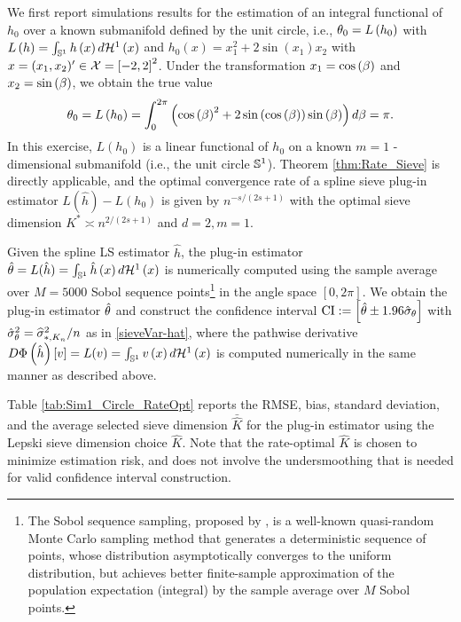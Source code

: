 \documentclass[12pt,american]{article}
\theoremstyle{definition}
\theoremstyle{plain}
\theoremstyle{definition}
\theoremstyle{plain}
\theoremstyle{plain}
\theoremstyle{plain}
\theoremstyle{plain}
\theoremstyle{plain}
\begin{document}
We first report simulations results for the estimation of an integral functional
of $h_0$ over a known submanifold defined by the unit
circle, i.e., $\t_{0}=L\left(h_{0}\right)$ with $L\left(h\right)=\int_{\S^{1}}h\left(x\right)d{\cal H}^{1}\left(x\right)$ and
$h_{0}\left(x\right)=x_{1}^{2}+2\sin\left(x_{1}\right)x_{2}$ with $x=(x_1,x_2)^{\prime} \in{\cal X}=\left[-2,2\right]^{2}$.
Under the transformation $x_{1}=\cos\left(\b\right)$ and
$x_{2}=\sin\left(\b\right)$, we obtain the true value
\[
  \t_{0}=L\left(h_{0}\right)=\int_{0}^{2\pi}\left(\text{cos}\left(\b\right)^{2}+2\sin\left(\cos\left(\b\right)\right)\sin\left(\b\right)\right)d\b=\pi.
\]
 In this exercise, $L(h_0)$ is a linear functional of $h_0$ on a known $m=1$ -dimensional submanifold (i.e., the unit circle $\S^{1}$). Theorem \ref{thm:Rate_Sieve} is directly applicable, and the optimal convergence rate of a spline sieve plug-in estimator $L(\hat{h}) - L(h_0)$ is given by $n^{-s/(2s+1)}$ with the optimal sieve dimension $K^* \asymp n^{2/(2s+1)}$ and $d=2,m=1$.


Given the spline LS estimator $\hat{h}$, the plug-in estimator $\hat{\t}=L(\hat{h})=\int_{\S^{1}} \hat{h}\left(x\right)d{\cal H}^{1}\left(x\right)$ is numerically computed using the sample
average over $M=5000$ Sobol sequence points\footnote{The Sobol sequence sampling, proposed by \cite{sobol1967distribution}, is a well-known quasi-random Monte Carlo sampling method that generates a deterministic sequence of points, whose distribution asymptotically converges to the uniform distribution, but achieves better finite-sample approximation of the population expectation (integral) by the sample average over $M$ Sobol points.} in the angle space $\left[0,2\pi\right]$.
We obtain the plug-in estimator $\hat{\t}$ and construct the confidence
interval $\text{CI}:=\left[\hat{\t}\pm1.96\hat{\s}_{\t}\right]$ with $\hat{\s}_{\t}^{2}=\widehat{\sigma}^2_{*,K_{n}}/n$ as in \eqref{sieveVar-hat},
where the pathwise derivative $D\Phi\left(\hat{h}\right)\left[v\right]=L(v)=\int_{\S^{1}}v\left(x\right)d{\cal H}^{1}\left(x\right)$
is computed numerically in the same manner as described above.

Table \ref{tab:Sim1_Circle_RateOpt} reports the RMSE, bias, standard deviation, and the average selected sieve dimension $\bar{\hat{K}}$ for the plug-in estimator using the Lepski sieve dimension choice $\hat{K}$. Note that the rate-optimal $\hat{K}$ is chosen to minimize estimation risk, and does not involve the undersmoothing that is needed for valid confidence interval construction.
\end{document}
